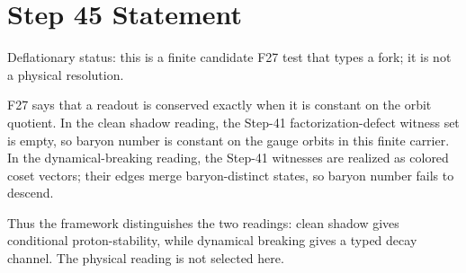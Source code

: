 \documentclass[11pt]{article}
\begin{document}
\section*{Step 45 Statement}
Deflationary status: this is a finite candidate F27 test that types a fork; it is not a physical resolution.

F27 says that a readout is conserved exactly when it is constant on the orbit quotient. In the clean shadow reading, the Step-41 factorization-defect witness set is empty, so baryon number is constant on the gauge orbits in this finite carrier. In the dynamical-breaking reading, the Step-41 witnesses are realized as colored coset vectors; their edges merge baryon-distinct states, so baryon number fails to descend.

Thus the framework distinguishes the two readings: clean shadow gives conditional proton-stability, while dynamical breaking gives a typed decay channel. The physical reading is not selected here.
\end{document}

